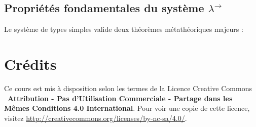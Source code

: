 \documentclass{article}
\begin{document}
\subsection{Propriétés fondamentales du système \texorpdfstring{$\lambda^{\to}$}{lambda ->}}

Le système de types simples valide deux théorèmes métathéoriques majeurs :



\newpage
\tableofcontents

\section*{Crédits}
Ce cours est mis à disposition selon les termes de la Licence Creative Commons \ccbyncsa\ \textbf{Attribution - Pas d'Utilisation Commerciale - Partage dans les Mêmes Conditions 4.0 International}. 
Pour voir une copie de cette licence, visitez \url{http://creativecommons.org/licenses/by-nc-sa/4.0/}.
\end{document}
